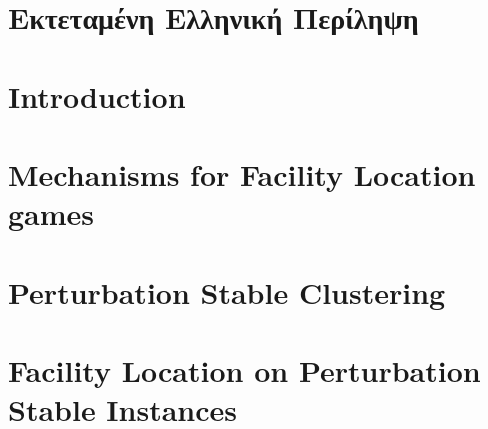 \documentclass[diploma]{softlab-thesis}
\begin{document}

\mainmatter
\chapter{Εκτεταμένη Ελληνική Περίληψη}


\begin{english}

\chapter{Introduction}

\chapter{Mechanisms for Facility Location games}

\chapter{Perturbation Stable Clustering}

\chapter{Facility Location on Perturbation Stable Instances}

%





\end{english}
\end{document}
